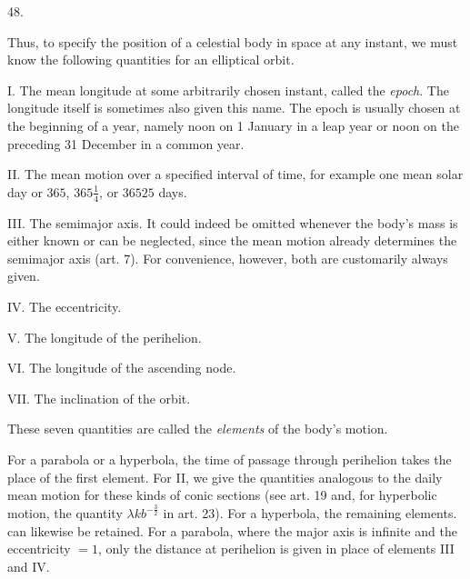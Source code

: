 \par{}
\begin{center}
\hypertarget{native-066-article048}{}48.
\end{center}
Thus, to specify the position of a celestial body in space at any instant, we must know the following quantities for an elliptical orbit.

I. The mean longitude at some arbitrarily chosen instant, called the \emph{epoch}. The longitude itself is sometimes also given this name. The epoch is usually chosen at the beginning of a year, namely noon on 1 January in a leap year or noon on the preceding 31 December in a common year.

II. The mean motion over a specified interval of time, for example one mean solar day or $365$, $365\tfrac{1}{4}$, or $36525$ days.

III. The semimajor axis. It could indeed be omitted whenever the body's mass is either known or can be neglected, since the mean motion already determines the semimajor axis (art. 7). For convenience, however, both are customarily always given.

IV. The eccentricity.

V. The longitude of the perihelion.

VI. The longitude of the ascending node.

VII. The inclination of the orbit.

These seven quantities are called the \emph{elements} of the body's motion.

For a parabola or a hyperbola, the time of passage through perihelion takes the place of the first element. For II, we give the quantities analogous to the daily mean motion for these kinds of conic sections (see art. 19 and, for hyperbolic motion, the quantity $\lambda k b^{-\frac{3}{2}}$ in art. 23). For a hyperbola, the remaining elements. can likewise be retained. For a parabola, where the major axis is infinite and the eccentricity $=1$, only the distance at perihelion is given in place of elements III and IV.

